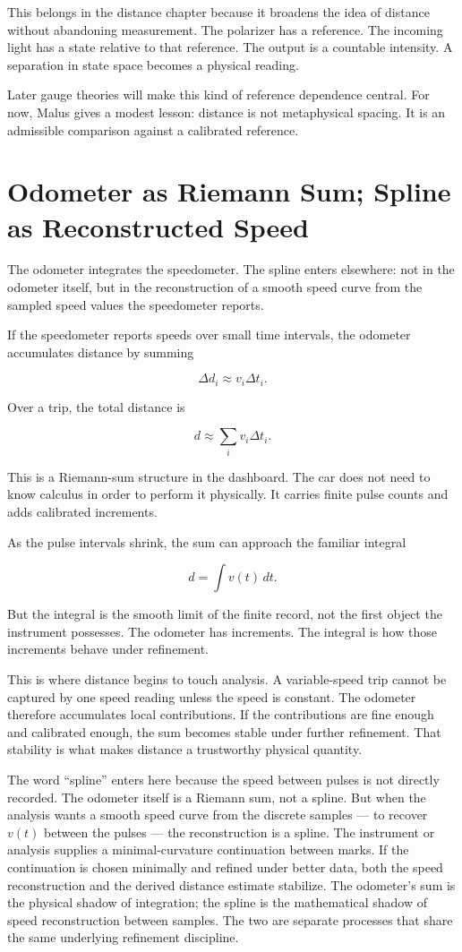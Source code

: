 This belongs in the distance chapter because it broadens the idea of distance
without abandoning measurement. The polarizer has a reference. The incoming
light has a state relative to that reference. The output is a countable
intensity. A separation in state space becomes a physical reading.

Later gauge theories will make this kind of reference dependence central. For
now, Malus gives a modest lesson: distance is not metaphysical spacing. It is an
admissible comparison against a calibrated reference.

\section{Odometer as Riemann Sum; Spline as Reconstructed Speed}
\label{se:odometer-as-spline}

The odometer integrates the speedometer. The spline enters
elsewhere: not in the odometer itself, but in the reconstruction
of a smooth speed curve from the sampled speed values the
speedometer reports.

If the speedometer reports speeds over small time intervals, the odometer
accumulates distance by summing

\[
\Delta d_i \approx v_i \Delta t_i.
\]

Over a trip, the total distance is

\[
d \approx \sum_i v_i \Delta t_i.
\]

This is a Riemann-sum structure in the dashboard. The car does not need to know
calculus in order to perform it physically. It carries finite pulse counts and
adds calibrated increments.

As the pulse intervals shrink, the sum can approach the familiar integral

\[
d = \int v(t)\,dt.
\]

But the integral is the smooth limit of the finite record, not the first object
the instrument possesses. The odometer has increments. The integral is how
those increments behave under refinement.

This is where distance begins to touch analysis. A variable-speed trip cannot
be captured by one speed reading unless the speed is constant. The odometer
therefore accumulates local contributions. If the contributions are fine enough
and calibrated enough, the sum becomes stable under further refinement. That
stability is what makes distance a trustworthy physical quantity.

The word ``spline'' enters here because the speed between pulses is not
directly recorded. The odometer itself is a Riemann sum, not a spline.
But when the analysis wants a smooth speed curve from the discrete
samples --- to recover $v(t)$ between the pulses --- the reconstruction
is a spline. The instrument or analysis supplies a minimal-curvature
continuation between marks. If the continuation is chosen minimally and
refined under better data, both the speed reconstruction and the
derived distance estimate stabilize. The odometer's sum is the physical
shadow of integration; the spline is the mathematical shadow of speed
reconstruction between samples. The two are separate processes that
share the same underlying refinement discipline.

